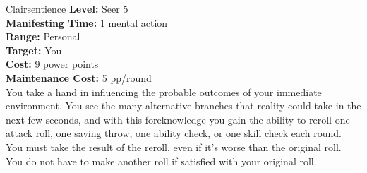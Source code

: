{Clairsentience}
{
	\textbf{Level:}
	Seer 5\\
	\textbf{Manifesting Time:}
	1 mental action\\
	\textbf{Range:}
	Personal\\
	\textbf{Target:}
	You\\
	\textbf{Cost:}
	9 power points\\
	\textbf{Maintenance Cost:}
	5 pp/round\\
}
{
	You take a hand in influencing the probable outcomes of your immediate environment. You see the many alternative branches that reality could take in the next few seconds, and with this foreknowledge you gain the ability to reroll one attack roll, one saving throw, one ability check, or one skill check each round. You must take the result of the reroll, even if it’s worse than the original roll. You do not have to make another roll if satisfied with your original roll.
}
